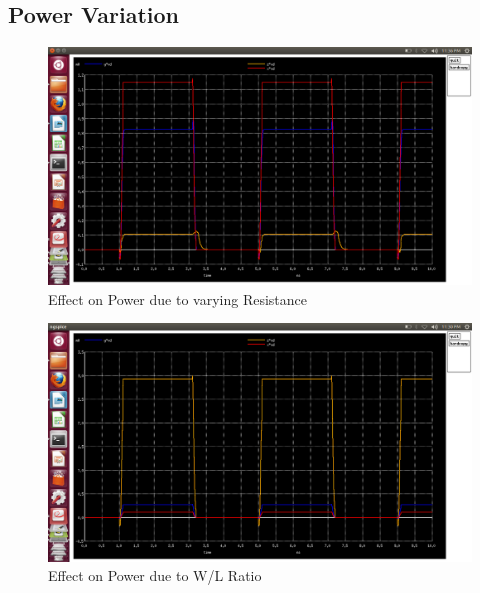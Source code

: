 \documentclass[12pt,a4paper]{article}
\begin{document}
\begin{center}
\subsection{Power Variation}
\begin{figure}[!ht]
\centering
\includegraphics[scale=0.37]{lab2_power_dueto_varyR.png}
\caption[Short]{Effect on Power due to varying Resistance}
\end{figure}

\begin{figure}[!ht]
\centering
\includegraphics[scale=0.37]{lab2_power_dueto_waring_WbyL.png}
\caption[Short]{Effect on Power due to W/L Ratio}
\end{figure}
\clearpage

\end{center}
\end{document}
